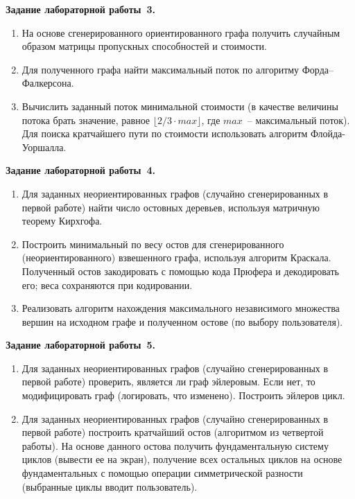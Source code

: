 \textbf{Задание лабораторной работы~3.}
\begin{enumerate}
    \item На основе сгенерированного ориентированного графа получить случайным образом
    матрицы пропускных способностей и стоимости.

    \item Для полученного графа найти максимальный поток по алгоритму
    Форда--Фалкерсона.

    \item Вычислить заданный поток минимальной стоимости (в качестве величины потока
    брать значение, равное $\lfloor 2/3 \cdot \mathit{max} \rfloor$, где
    $\mathit{max}$~-- максимальный поток). Для поиска кратчайшего пути по стоимости
    использовать алгоритм Флойда-Уоршалла.
\end{enumerate}

\textbf{Задание лабораторной работы~4.}
\begin{enumerate}
    \item Для заданных неориентированных графов (случайно сгенерированных в первой
    работе) найти число остовных деревьев, используя матричную теорему Кирхгофа.

    \item Построить минимальный по весу остов для сгенерированного (неориентированного)
    взвешенного графа, используя алгоритм Краскала. Полученный остов закодировать
    с помощью кода Прюфера и декодировать его; веса сохраняются при кодировании.

    \item Реализовать алгоритм нахождения максимального независимого множества вершин
    на исходном графе и полученном остове (по выбору пользователя).
\end{enumerate}

\textbf{Задание лабораторной работы~5.}
\begin{enumerate}
	\item Для заданных неориентированных графов (случайно сгенерированных в первой работе) проверить, является ли граф эйлеровым. Если нет, то модифицировать граф (логировать, что изменено). Построить эйлеров цикл.
	
	\item Для заданных неориентированных графов (случайно сгенерированных в первой работе) построить кратчайший остов (алгоритмом из четвертой работы).  На основе данного остова получить фундаментальную систему циклов (вывести ее на экран), получение всех остальных циклов на основе фундаментальных с помощью операции симметрической разности (выбранные циклы вводит пользователь).
\end{enumerate}